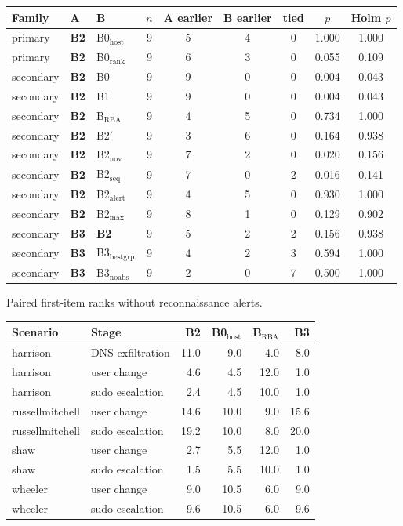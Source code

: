 \documentclass[10.5pt,a4paper]{article}
\begin{document}
\begin{center}\small
\begin{tabular}{@{}l l l c c c c c c@{}}
\toprule
Family & A & B & $n$ & A earlier & B earlier & tied & $p$ & Holm $p$ \\
\midrule
primary & \textbf{B2} & B0$_\mathrm{host}$ & 9 & 5 & 4 & 0 & 1.000 & 1.000 \\
primary & \textbf{B2} & B0$_\mathrm{rank}$ & 9 & 6 & 3 & 0 & 0.055 & 0.109 \\
secondary & \textbf{B2} & B0 & 9 & 9 & 0 & 0 & 0.004 & 0.043 \\
secondary & \textbf{B2} & B1 & 9 & 9 & 0 & 0 & 0.004 & 0.043 \\
secondary & \textbf{B2} & B$_\mathrm{RBA}$ & 9 & 4 & 5 & 0 & 0.734 & 1.000 \\
secondary & \textbf{B2} & B2$'$ & 9 & 3 & 6 & 0 & 0.164 & 0.938 \\
secondary & \textbf{B2} & B2$_\mathrm{nov}$ & 9 & 7 & 2 & 0 & 0.020 & 0.156 \\
secondary & \textbf{B2} & B2$_\mathrm{seq}$ & 9 & 7 & 0 & 2 & 0.016 & 0.141 \\
secondary & \textbf{B2} & B2$_\mathrm{alert}$ & 9 & 4 & 5 & 0 & 0.930 & 1.000 \\
secondary & \textbf{B2} & B2$_\mathrm{max}$ & 9 & 8 & 1 & 0 & 0.129 & 0.902 \\
secondary & \textbf{B3} & \textbf{B2} & 9 & 5 & 2 & 2 & 0.156 & 0.938 \\
secondary & \textbf{B3} & B3$_\mathrm{bestgrp}$ & 9 & 4 & 2 & 3 & 0.594 & 1.000 \\
secondary & \textbf{B3} & B3$_\mathrm{noabs}$ & 9 & 2 & 0 & 7 & 0.500 & 1.000 \\
\bottomrule
\end{tabular}
\par\smallskip\footnotesize Paired first-item ranks without reconnaissance alerts.
\end{center}
\begin{center}\small
\begin{tabular}{@{}l l rrrr@{}}
\toprule
Scenario & Stage & \textbf{B2} & B0$_\mathrm{host}$ & B$_\mathrm{RBA}$ & \textbf{B3} \\
\midrule
harrison & DNS exfiltration & 11.0 & 9.0 & 4.0 & 8.0 \\
harrison & user change & 4.6 & 4.5 & 12.0 & 1.0 \\
harrison & sudo escalation & 2.4 & 4.5 & 10.0 & 1.0 \\
russellmitchell & user change & 14.6 & 10.0 & 9.0 & 15.6 \\
russellmitchell & sudo escalation & 19.2 & 10.0 & 8.0 & 20.0 \\
shaw & user change & 2.7 & 5.5 & 12.0 & 1.0 \\
shaw & sudo escalation & 1.5 & 5.5 & 10.0 & 1.0 \\
wheeler & user change & 9.0 & 10.5 & 6.0 & 9.0 \\
wheeler & sudo escalation & 9.6 & 10.5 & 6.0 & 9.6 \\
\bottomrule
\end{tabular}
\end{center}
\end{document}
